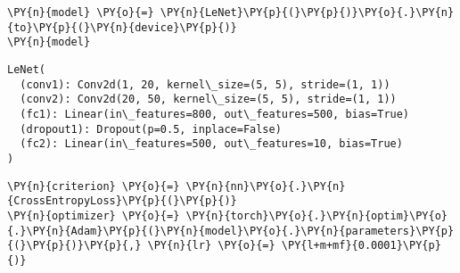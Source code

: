     \begin{tcolorbox}[breakable, size=fbox, boxrule=1pt, pad at break*=1mm,colback=cellbackground, colframe=cellborder]
\begin{Verbatim}[commandchars=\\\{\}]
\PY{n}{model} \PY{o}{=} \PY{n}{LeNet}\PY{p}{(}\PY{p}{)}\PY{o}{.}\PY{n}{to}\PY{p}{(}\PY{n}{device}\PY{p}{)}
\PY{n}{model}
\end{Verbatim}
\end{tcolorbox}

            \begin{tcolorbox}[breakable, size=fbox, boxrule=.5pt, pad at break*=1mm, opacityfill=0]
\begin{Verbatim}[commandchars=\\\{\}]
LeNet(
  (conv1): Conv2d(1, 20, kernel\_size=(5, 5), stride=(1, 1))
  (conv2): Conv2d(20, 50, kernel\_size=(5, 5), stride=(1, 1))
  (fc1): Linear(in\_features=800, out\_features=500, bias=True)
  (dropout1): Dropout(p=0.5, inplace=False)
  (fc2): Linear(in\_features=500, out\_features=10, bias=True)
)
\end{Verbatim}
\end{tcolorbox}
        
    \begin{tcolorbox}[breakable, size=fbox, boxrule=1pt, pad at break*=1mm,colback=cellbackground, colframe=cellborder]
\begin{Verbatim}[commandchars=\\\{\}]
\PY{n}{criterion} \PY{o}{=} \PY{n}{nn}\PY{o}{.}\PY{n}{CrossEntropyLoss}\PY{p}{(}\PY{p}{)}
\PY{n}{optimizer} \PY{o}{=} \PY{n}{torch}\PY{o}{.}\PY{n}{optim}\PY{o}{.}\PY{n}{Adam}\PY{p}{(}\PY{n}{model}\PY{o}{.}\PY{n}{parameters}\PY{p}{(}\PY{p}{)}\PY{p}{,} \PY{n}{lr} \PY{o}{=} \PY{l+m+mf}{0.0001}\PY{p}{)}
\end{Verbatim}
\end{tcolorbox}

